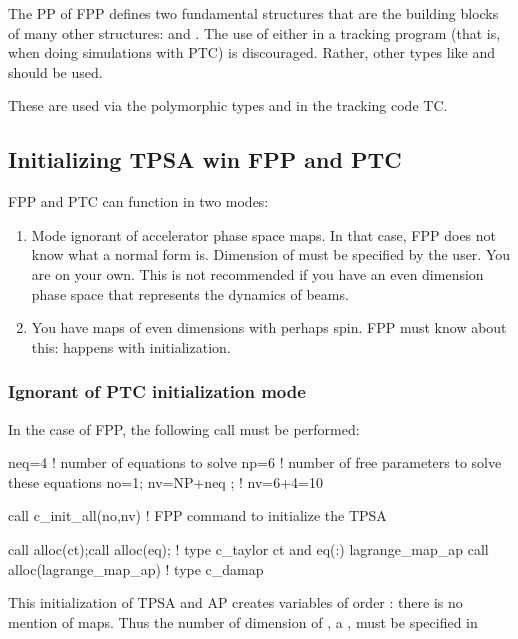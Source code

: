 \documentclass{hitec}     %
\begin{document}
{{The PP of FPP defines two fundamental structures that are the building blocks of many other structures:
 and . The  use of either in a tracking program (that is,
when doing simulations with PTC) is discouraged. Rather, other types like  and 
should be used.

{\color{h}These are used  via the polymorphic types  and  in the tracking code TC.}
\subsection{Initializing TPSA win FPP and PTC}
\label{s:inittaylor}


FPP and PTC can function in two modes:

\begin{enumerate}
\item Mode ignorant of accelerator phase space maps. In that case, FPP does not know what a normal form is. Dimension of  must be specified by the user. You are on your own. This is not recommended if you have an even dimension phase space that represents the dynamics of beams.
\item You have maps of even dimensions with perhaps spin. FPP must know about this: happens with initialization.
\end{enumerate}

\subsubsection{Ignorant of PTC  initialization mode}
\label{s:initigno}

In the case of FPP, the following call must be performed:

\begin{code}
neq=4    ! number of equations to solve
np=6     ! number of free parameters to solve these equations
no=1; nv=NP+neq ;  ! nv=6+4=10

call c_init_all(no,nv)   ! FPP command to initialize the TPSA

call alloc(ct);call alloc(eq);  ! type c_taylor ct and eq(:)
lagrange_map_ap%
call alloc(lagrange_map_ap)  ! type c_damap 
\end{code}

This initialization of TPSA and AP creates  variables of order : there is no mention of maps. Thus the number of dimension of  , a  , must be specified in \vn{lagrange_map_ap%
This number can be from  \vn{lagrange_map_ap%
Any attempt to normalized that map would lead to a crash.

}}}}
\end{document}
